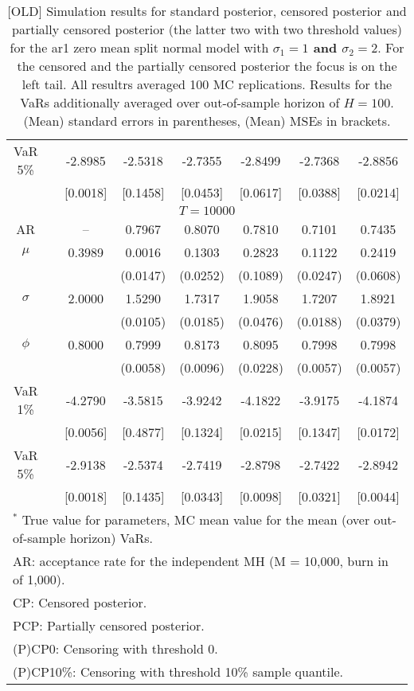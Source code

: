 {\begin{table}
\begin{tabular}{cc cccccc}
VaR 5\% && -2.8985 & -2.5318 & -2.7355 & -2.8499 & -2.7368 & -2.8856 \\ 
 && [0.0018] & [0.1458] & [0.0453] & [0.0617] & [0.0388] & [0.0214] \\ 
\hline 
\multicolumn{8}{c}{$T =10000$}  \\ 
\hline 
AR && -- & 0.7967 & 0.8070 & 0.7810 & 0.7101 & 0.7435 \\  
$\mu$&& 0.3989 & 0.0016 & 0.1303 & 0.2823 & 0.1122 & 0.2419 \\ 
&&   & (0.0147) & (0.0252) & (0.1089) & (0.0247) & (0.0608) \\ 
$\sigma$&& 2.0000 & 1.5290 & 1.7317 & 1.9058 & 1.7207 & 1.8921 \\ 
&&   & (0.0105) & (0.0185) & (0.0476) & (0.0188) & (0.0379) \\ 
$\phi$&& 0.8000 & 0.7999 & 0.8173 & 0.8095 & 0.7998 & 0.7998 \\ 
&&   & (0.0058) & (0.0096) & (0.0228) & (0.0057) & (0.0057) \\ 
VaR 1\% && -4.2790 & -3.5815 & -3.9242 & -4.1822 & -3.9175 & -4.1874 \\ 
  && [0.0056] & [0.4877] & [0.1324] & [0.0215] & [0.1347] & [0.0172] \\ 
VaR 5\% && -2.9138 & -2.5374 & -2.7419 & -2.8798 & -2.7422 & -2.8942 \\ 
 && [0.0018] & [0.1435] & [0.0343] & [0.0098] & [0.0321] & [0.0044] \\ 
\hline 
\multicolumn{8}{l}{\footnotesize{$^*$ True value for parameters, MC mean value for the mean (over out-of-sample horizon) VaRs.}}  \\ 
\multicolumn{8}{l}{\footnotesize{AR: acceptance rate for the independent MH (M = 10,000, burn in of 1,000).}}  \\ 
\multicolumn{8}{l}{\footnotesize{CP: Censored posterior.}}  \\ 
\multicolumn{8}{l}{\footnotesize{PCP: Partially censored posterior.}} \\ 
\multicolumn{8}{l}{\footnotesize{(P)CP0: Censoring with threshold 0.}} \\ 
\multicolumn{8}{l}{\footnotesize{(P)CP10\%: Censoring with threshold 10\% sample quantile.}}  \\ 
\end{tabular}
 \caption{[OLD] Simulation results for standard posterior, censored posterior and partially censored posterior (the latter two with two threshold values) for the ar1 zero mean split normal model with \textbf{$\sigma_{1} = 1$ and $\sigma_{2} = 2$}. For the censored and the partially censored posterior the focus is on the left tail. All resultrs averaged 100 MC replications. Results for the VaRs additionally averaged over out-of-sample horizon of $H=100$. (Mean) standard errors in parentheses, (Mean) MSEs in brackets.} 
\label{tab:ar1_pcp}  
\end{table}
}